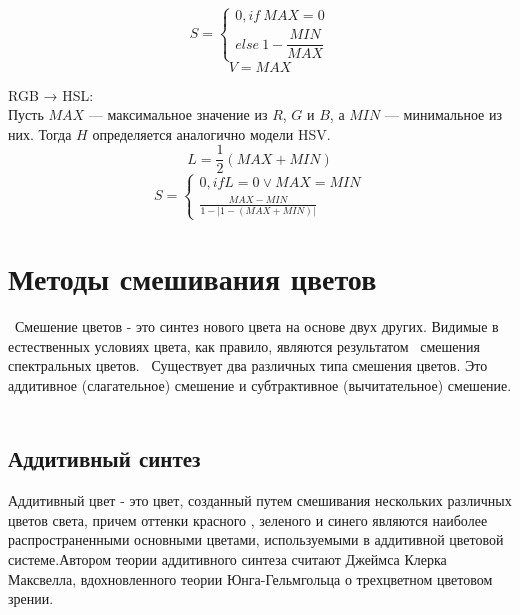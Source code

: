  \begin{equation}
S={\begin{cases} 0, if~{\displaystyle MAX=0} \\
else~{\displaystyle 1-{\dfrac {MIN}{MAX}}}  
	\end{cases}}	
\end{equation}
 \begin{equation}
V=MAX
\end{equation}

RGB → HSL:\\
Пусть $MAX$ — максимальное значение из $R$, $G$ и $B$, а $MIN$ — минимальное из них. Тогда $H$ определяется аналогично модели HSV.
 \begin{equation}
L=\frac{1}{2}(MAX+MIN)
\end{equation}
 \begin{equation}
S={\begin{cases} 0, if  L = 0 \vee MAX = MIN \\
	 \frac{MAX-MIN}{1-|1-(MAX+MIN)|}
	\end{cases}}
\end{equation}

\section{Методы смешивания цветов}
 Смешение цветов - это синтез нового цвета на основе двух других.  Видимые в естественных условиях цвета, как правило, являются результатом
 смешения спектральных цветов.
 Существует два различных типа смешения цветов. Это аддитивное (слагательное) смешение и субтрактивное (вычитательное) смешение.
 
\subsection{Аддитивный синтез}
Аддитивный цвет - это цвет, созданный путем смешивания нескольких различных цветов света, причем оттенки красного , зеленого и синего являются наиболее распространенными основными цветами, используемыми в аддитивной цветовой системе.Автором теории аддитивного синтеза считают Джеймса Клерка Максвелла, вдохновленного теории Юнга-Гельмгольца о трехцветном цветовом зрении.

\begin{figure}[ht!]
\end{figure}

